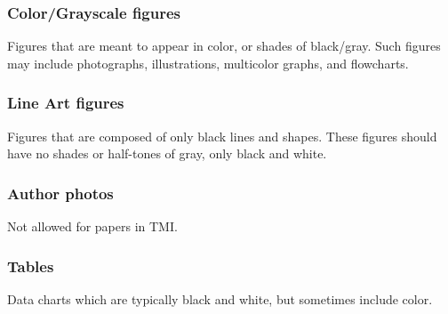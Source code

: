 \documentclass[journal,twoside,web]{ieeecolor}
\begin{document}
\subsubsection{Color/Grayscale figures}
{Figures that are meant to appear in color, or shades of black/gray. Such 
figures may include photographs, illustrations, multicolor graphs, and 
flowcharts.}

\subsubsection{Line Art figures}
{Figures that are composed of only black lines and shapes. These figures 
should have no shades or half-tones of gray, only black and white.}

\subsubsection{Author photos}
{Not allowed for papers in TMI.}

\subsubsection{Tables}
{Data charts which are typically black and white, but sometimes include 
color.}
\end{document}
